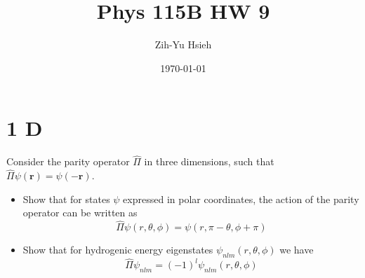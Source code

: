 \documentclass{article}
\title{Phys 115B HW 9}
\author{Zih-Yu Hsieh}
\date{\today}
\begin{document}
\maketitle

\section*{1 D}
\begin{ques}\label{q1}
Consider the parity operator $\hat{\Pi}$ in three dimensions, such that $\hat{\Pi}\psi(\mathbf r)=\psi(-\mathbf r)$.

\begin{itemize}
\item[(a)] Show that for states $\psi$ expressed in polar coordinates, the action of the parity operator can be written as
\[
\hat{\Pi}\psi(r,\theta,\phi)=\psi(r,\pi-\theta,\phi+\pi)
\]

\item[(b)] Show that for hydrogenic energy eigenstates $\psi_{nlm}(r,\theta,\phi)$ we have
\[
\hat{\Pi}\psi_{nlm}=(-1)^l\psi_{nlm}(r,\theta,\phi)
\]
\end{itemize}
\end{ques}
\end{document}
